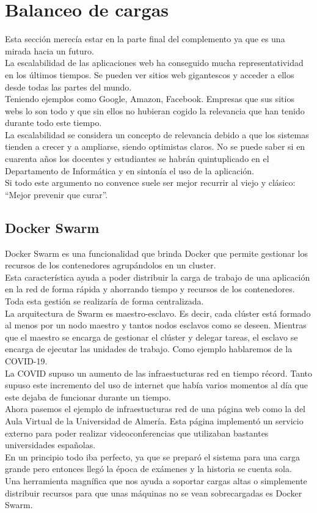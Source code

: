 \section{Balanceo de cargas}
Esta sección merecía estar en la parte final del complemento ya que es una mirada hacia un futuro.
\\La escalabilidad de las aplicaciones web ha conseguido mucha representatividad en los últimos tiempos. Se pueden ver sitios web gigantescos y acceder a ellos desde todas las partes del mundo.
\\Teniendo ejemplos como Google, Amazon, Facebook. Empresas que sus sitios webs lo son todo y que sin ellos no hubieran cogido la relevancia que han tenido durante todo este tiempo.
\\La escalabilidad se considera un concepto de relevancia debido a que los sistemas tienden a crecer y a ampliarse, siendo optimistas claros. No se puede saber si en cuarenta años los docentes y estudiantes se habrán quintuplicado en el Departamento de Informática y en sintonía el uso de la aplicación.
\\Si todo este argumento no convence suele ser mejor recurrir al viejo y clásico: ``Mejor prevenir que curar''.

\subsection{Docker Swarm}
Docker Swarm \cite{docker-swarm-book} es una funcionalidad que brinda Docker que permite gestionar los recursos de los contenedores agrupándolos en un cluster.
\\Esta característica ayuda a poder distribuir la carga de trabajo de una aplicación en la red de forma rápida y ahorrando tiempo y recursos de los contenedores. Toda esta gestión se realizaría de forma centralizada.
\\La arquitectura de Swarm es maestro-esclavo. Es decir, cada clúster está formado al menos por un nodo maestro y tantos nodos esclavos como se deseen. Mientras que el maestro se encarga de gestionar el clúster y delegar tareas, el esclavo se encarga de ejecutar las unidades de trabajo. Como ejemplo hablaremos de la COVID-19.
\\La COVID supuso un aumento de las infraestucturas red en tiempo récord. Tanto supuso este incremento del uso de internet que había varios momentos al día que este dejaba de funcionar durante un tiempo.
\\Ahora pasemos el ejemplo de infraestucturas red de una página web como la del Aula Virtual de la Universidad de Almería. Esta página implementó un servicio externo para poder realizar videoconferencias que utilizaban bastantes universidades españolas.
\\En un principio todo iba perfecto, ya que se preparó el sistema para una carga grande pero entonces llegó la época de exámenes y la historia se cuenta sola.
\\Una herramienta magnífica que nos ayuda a soportar cargas altas o simplemente distribuir recursos para que unas máquinas no se vean sobrecargadas es Docker Swarm.

